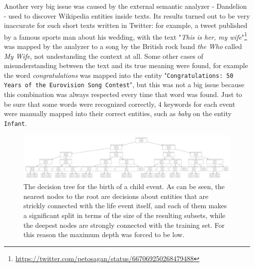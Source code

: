 Another very big issue was caused by the external semantic analyzer - Dandelion - used to discover Wikipedia entities inside texts. Its results turned out to be very inaccurate for such short texts written in Twitter: for example, a tweet published by a famous sports man about his wedding, with the text "\textit{This is her, my wife}"\footnote{\url{https://twitter.com/petosagan/status/667069250268479488}} was mapped by the analyzer to a song by the British rock band \textit{the Who} called \textit{My Wife}, not undestanding the context at all. Some other cases of misunderstanding between the text and its true meaning were found, for example the word \textit{congratulations} was mapped into the entity "\texttt{Congratulations: 50 Years of the Eurovision Song Contest}", but this was not a big issue because this combination was always respected every time that word was found. Just to be sure that some words were recognized correctly, 4 keywords for each event were manually mapped into their correct entities, such as \textit{baby} on the entity \texttt{Infant}.

\begin{figure}
\centering
\includegraphics[width=%
1\textwidth]{img/decisiontree}
\caption{The decision tree for the birth of a child event. As can be seen, the nearest nodes to the root are decisions about entities that are strickly connected with the life event itself, and each of them makes a significant split in terms of the size of the resulting subsets, while the deepest nodes are strongly connected with the training set. For this reason the maximum depth was forced to be low.}
\label{fig:decisiontree}
\end{figure}

